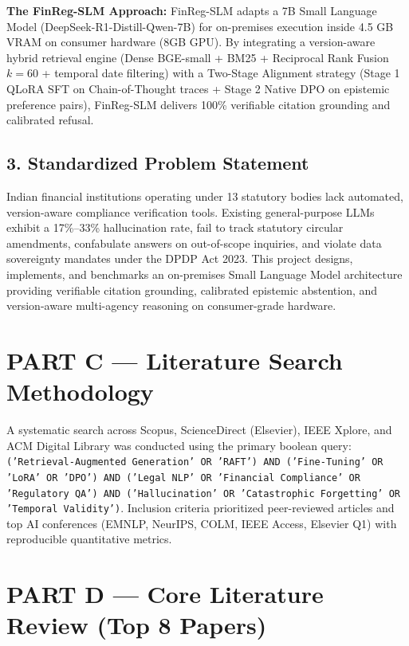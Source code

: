 \documentclass[11pt,a4paper]{article}
\begin{document}
\textbf{The FinReg-SLM Approach:} FinReg-SLM adapts a 7B Small Language Model (DeepSeek-R1-Distill-Qwen-7B) for on-premises execution inside 4.5 GB VRAM on consumer hardware (8GB GPU). By integrating a version-aware hybrid retrieval engine (Dense BGE-small + BM25 + Reciprocal Rank Fusion $k=60$ + temporal date filtering) with a Two-Stage Alignment strategy (Stage 1 QLoRA SFT on Chain-of-Thought traces + Stage 2 Native DPO on epistemic preference pairs), FinReg-SLM delivers 100\% verifiable citation grounding and calibrated refusal.

\subsection*{3. Standardized Problem Statement}
Indian financial institutions operating under 13 statutory bodies lack automated, version-aware compliance verification tools. Existing general-purpose LLMs exhibit a 17\%--33\% hallucination rate, fail to track statutory circular amendments, confabulate answers on out-of-scope inquiries, and violate data sovereignty mandates under the DPDP Act 2023. This project designs, implements, and benchmarks an on-premises Small Language Model architecture providing verifiable citation grounding, calibrated epistemic abstention, and version-aware multi-agency reasoning on consumer-grade hardware.

\section*{PART C --- Literature Search Methodology}
A systematic search across Scopus, ScienceDirect (Elsevier), IEEE Xplore, and ACM Digital Library was conducted using the primary boolean query: \texttt{('Retrieval-Augmented Generation' OR 'RAFT') AND ('Fine-Tuning' OR 'LoRA' OR 'DPO') AND ('Legal NLP' OR 'Financial Compliance' OR 'Regulatory QA') AND ('Hallucination' OR 'Catastrophic Forgetting' OR 'Temporal Validity')}. Inclusion criteria prioritized peer-reviewed articles and top AI conferences (EMNLP, NeurIPS, COLM, IEEE Access, Elsevier Q1) with reproducible quantitative metrics.

\section*{PART D --- Core Literature Review (Top 8 Papers)}
\end{document}
